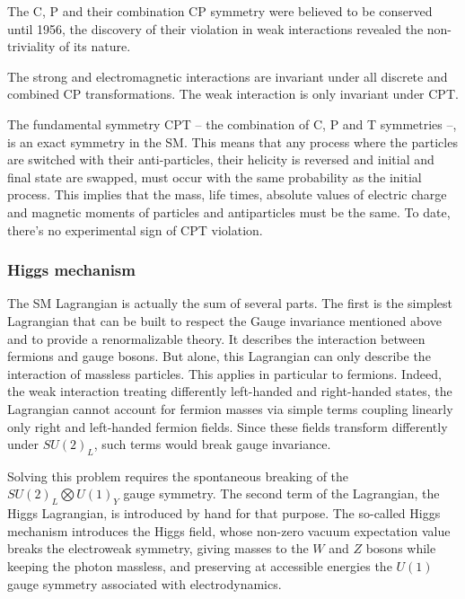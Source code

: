 \documentclass[../main.tex]{subfiles}
\begin{document}
The C, P and their combination CP symmetry were believed to be conserved until 1956, the discovery of their violation \cite{lee_question_1956, wu_experimental_1957, christenson_evidence_1964} in weak interactions revealed the non-triviality of its nature.

The strong and electromagnetic interactions are invariant under all discrete and combined CP transformations. The weak interaction is only invariant under CPT.

The fundamental symmetry CPT -- the combination of C, P and T symmetries --, is an exact symmetry in the SM. This means that any process where the particles are switched with their anti-particles, their helicity is reversed and initial and final state are swapped, must occur with the same probability as the initial process. This implies that the mass, life times, absolute values of electric charge and magnetic moments of particles and antiparticles must be the same. To date, there's no experimental sign of CPT violation.

\subsubsection{Higgs mechanism}

The SM Lagrangian is actually the sum of several parts. The first is the simplest Lagrangian that can be built to respect the Gauge invariance mentioned above and to provide a renormalizable theory. It describes the interaction between fermions and gauge bosons. But alone, this Lagrangian can only describe the interaction of massless particles. This applies in particular to fermions. Indeed, the weak interaction treating differently left-handed and right-handed states, the Lagrangian cannot account for fermion masses via simple terms coupling linearly only right and left-handed fermion fields. Since these fields transform differently under $SU(2)_L$, such terms would break gauge invariance.

Solving this problem requires the spontaneous breaking of the $SU(2)_L \bigotimes U(1)_Y$ gauge symmetry. The second term of the Lagrangian, the Higgs Lagrangian, is introduced by hand for that purpose. The so-called Higgs mechanism introduces the Higgs field, whose non-zero vacuum expectation value breaks the electroweak symmetry, giving masses to the $W$ and $Z$ bosons while keeping the photon massless, and preserving at accessible energies the $U(1)$ gauge symmetry associated with electrodynamics.
\end{document}
